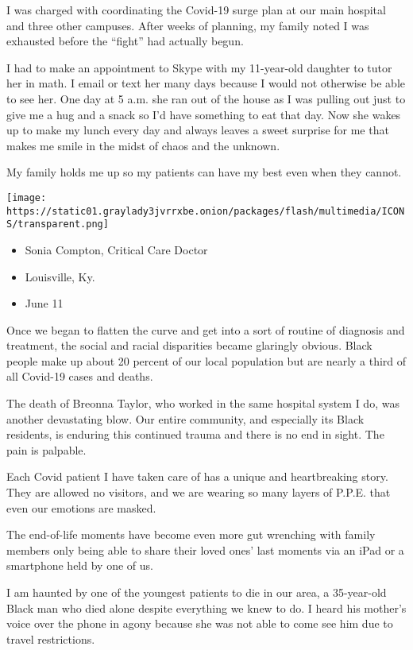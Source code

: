 I was charged with coordinating the Covid-19 surge plan at our main
hospital and three other campuses. After weeks of planning, my family
noted I was exhausted before the ``fight'' had actually begun.

I had to make an appointment to Skype with my 11-year-old daughter to
tutor her in math. I email or text her many days because I would not
otherwise be able to see her. One day at 5 a.m. she ran out of the house
as I was pulling out just to give me a hug and a snack so I'd have
something to eat that day. Now she wakes up to make my lunch every day
and always leaves a sweet surprise for me that makes me smile in the
midst of chaos and the unknown.

My family holds me up so my patients can have my best even when they
cannot.

\texttt{[image: https://static01.graylady3jvrrxbe.onion/packages/flash/multimedia/ICONS/transparent.png]}

\begin{itemize}
\tightlist
\item
   Sonia Compton, Critical Care Doctor
\item
  Louisville, Ky.
\item
  June 11
\end{itemize}

Once we began to flatten the curve and get into a sort of routine of
diagnosis and treatment, the social and racial disparities became
glaringly obvious. Black people make up about 20 percent of our local
population but are nearly a third of all Covid-19 cases and deaths.

The death of Breonna Taylor, who worked in the same hospital system I
do, was another devastating blow. Our entire community, and especially
its Black residents, is enduring this continued trauma and there is no
end in sight. The pain is palpable.

Each Covid patient I have taken care of has a unique and heartbreaking
story. They are allowed no visitors, and we are wearing so many layers
of P.P.E. that even our emotions are masked.

The end-of-life moments have become even more gut wrenching with family
members only being able to share their loved ones' last moments via an
iPad or a smartphone held by one of us.

I am haunted by one of the youngest patients to die in our area, a
35-year-old Black man who died alone despite everything we knew to do. I
heard his mother's voice over the phone in agony because she was not
able to come see him due to travel restrictions.

